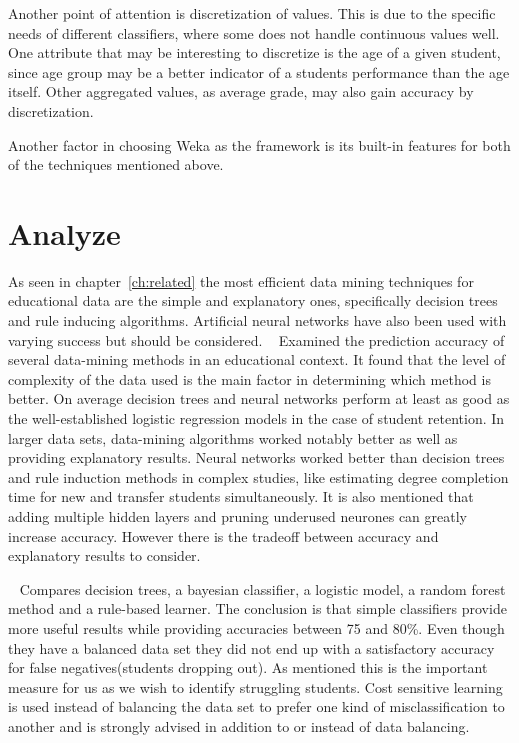 \bigskip\noindent
Another point of attention is discretization of values. 
This is due to the specific needs of different classifiers, where some does not handle continuous values well. 
One attribute that may be interesting to discretize is the age of a given student, 
since age group may be a better indicator of a students performance than the age itself. 
Other aggregated values, as average grade, may also gain accuracy by discretization.

\bigskip\noindent
Another factor in choosing Weka as the framework is its built-in features for both of the techniques mentioned above. 

\section{Analyze}
As seen in chapter~\ref{ch:related} the most efficient data mining techniques for educational data are the simple and explanatory ones,
specifically decision trees and rule inducing algorithms.
Artificial neural networks have also been used with varying success but should be considered.
~\cite{2} Examined the prediction accuracy of several data-mining methods in an educational context.
It found that the level of complexity of the data used is the main factor in determining which method is better.
On average decision trees and neural networks perform at least as good as the well-established logistic regression models in the case of student retention.
In larger data sets, data-mining algorithms worked notably better as well as providing explanatory results. 
Neural networks worked better than decision trees and rule induction methods in complex studies, like estimating degree completion time for new and transfer students simultaneously. 
It is also mentioned that adding multiple hidden layers and pruning underused neurones can greatly increase accuracy. 
However there is the tradeoff between accuracy and explanatory results to consider. 

\bigskip\noindent
~\cite{7} Compares decision trees, a bayesian classifier, a logistic model, a random forest method and a rule-based learner.
The conclusion is that simple classifiers provide more useful results while providing accuracies between 75 and 80\%.
Even though they have a balanced data set they did not end up with a satisfactory accuracy for  false negatives(students dropping out). As mentioned this is the important measure for us as we wish to identify struggling students. Cost sensitive learning is used instead of balancing the data set to prefer one kind of misclassification to another and is strongly advised in addition to or instead of data balancing.  

